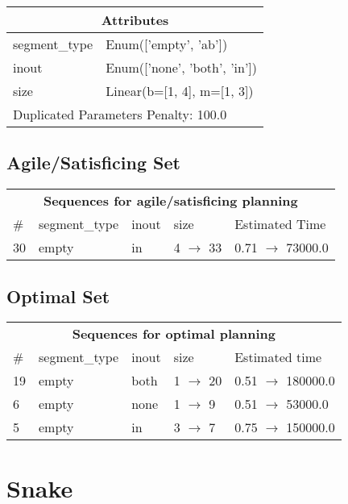 \documentclass{article}
\begin{document}
                    \begin{center}
                    \begin{tabular}{p{}p{}}
                    \multicolumn{2}{c}{\bf \large Attributes}\\\midrule
                    segment\_type & Enum(['empty', 'ab'])\\
inout & Enum(['none', 'both', 'in'])\\
size & Linear(b=[1, 4], m=[1, 3])
                    
                     \\\midrule
                    \multicolumn{2}{l}{Duplicated Parameters Penalty: 100.0}
                    \end{tabular}
                    \end{center}
                
                         \subsection*{Agile/Satisficing Set}

                        \begin{center}
                        \begin{tabular}{l|l|l|l|l}
                        \multicolumn{5}{c}{\bf \large Sequences for agile/satisficing planning}\\
                        \# & segment\_type & inout & size & Estimated Time\\\midrule
                        30&empty&in&4 $\rightarrow$ 33&0.71 $\rightarrow$ 73000.0
                        \end{tabular}
                        \end{center}
                    
                            \subsection*{Optimal Set}

                            \begin{center}
                            \begin{tabular}{l|l|l|l|l}
                            \multicolumn{5}{c}{\bf \large Sequences for optimal planning}\\
                            \# & segment\_type & inout & size & Estimated time\\\midrule
                            19&empty&both&1 $\rightarrow$ 20&0.51 $\rightarrow$ 180000.0\\
6&empty&none&1 $\rightarrow$ 9&0.51 $\rightarrow$ 53000.0\\
5&empty&in&3 $\rightarrow$ 7&0.75 $\rightarrow$ 150000.0
                            \end{tabular}
                            \end{center}
                    \newpage \section{Snake}
\end{document}
